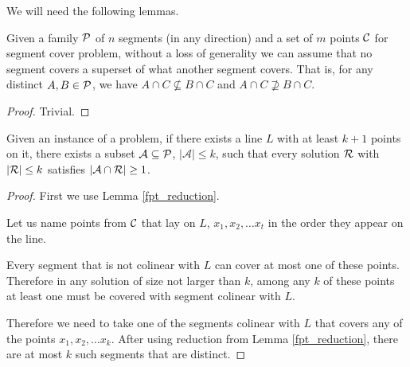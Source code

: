We will need the following lemmas.

\begin{lemma}
   \label{fpt_reduction}
   Given a family $\mathcal{P}$ of
	$n$ segments (in any direction)
	and a set of $m$ points $\mathcal{C}$
	for segment cover problem,
   without a loss of generality we can assume that
   no segment covers a superset of what another segment covers.
   That is, for any distinct $A, B \in \mathcal{P}$, we have
   $A \cap C \not \subseteq B \cap C$ and $A \cap C \not \supseteq B \cap C$.
\end{lemma}   
   
\begin{proof} Trivial. \end{proof}

\begin{lemma}
	\label{fpt_long_lines}
	Given an instance of a problem, if there exists a line $L$ with at least
	$k+1$ points on it, there exists a subset $\mathcal{A} \subseteq \mathcal{P}$,
	$|\mathcal{A}| \le k$,
	such that every solution $\mathcal{R}$ with $|\mathcal{R}| \le k$
	satisfies $|\mathcal{A} \cap \mathcal{R}| \ge 1$.
\end{lemma}

\begin{proof}

First we use Lemma \ref{fpt_reduction}.

Let us name points from $\mathcal{C}$ that lay on $L$, $x_1, x_2, \ldots x_t$
in the order they appear on the line.

Every segment that is not colinear with $L$ can cover at most one of these
points. Therefore in any solution of size not larger than $k$,
among any $k$ of these points at least one must
be covered with segment colinear with $L$.

Therefore we need to take one of the segments colinear
with $L$ that covers any of the points
$x_1, x_2, \ldots x_k$. After using reduction from Lemma \ref{fpt_reduction},
there are at most $k$ such segments that are distinct.
\end{proof}



